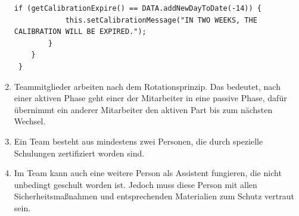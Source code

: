 \begin{enumerate}
\begin{lstlisting}[frame=single]
        if (getCalibrationExpire() == DATA.addNewDayToDate(-14)) {
            this.setCalibrationMessage("IN TWO WEEKS, THE CALIBRATION WILL BE EXPIRED.");
        }
    }
 }
\end{lstlisting}
\item Teammitglieder arbeiten nach dem Rotationsprinzip. Das bedeutet, nach einer aktiven Phase
geht einer der Mitarbeiter in eine passive Phase, dafür übernimmt ein anderer Mitarbeiter
den aktiven Part bis zum nächsten Wechsel.
\item Ein Team besteht aus mindestens zwei Personen, die durch spezielle Schulungen zertifiziert worden sind.
\item Im Team kann auch eine weitere Person als Assistent fungieren, die nicht unbedingt geschult worden ist. Jedoch muss diese Person mit allen Sicherheitsmaßnahmen und entsprechenden
Materialien zum Schutz vertraut sein.
\end{enumerate}

